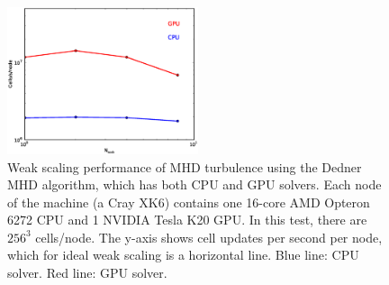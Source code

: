 \begin{figure}
\centerline{\includegraphics[width=0.5\textwidth]{figures/gpu_scaling.eps}}
\caption{Weak scaling performance of MHD turbulence using the Dedner
MHD algorithm, which has both CPU and GPU solvers.  Each node of the
machine (a Cray XK6) contains one 16-core AMD Opteron 6272 CPU and 1
NVIDIA Tesla K20 GPU.  In this test, there are $256^3$ cells/node.
The y-axis shows cell updates per second per node, which for ideal
weak scaling is a horizontal line.  Blue line: CPU solver.  Red line:
GPU solver.}
\label{fig:gpu_scaling}
\end{figure}

